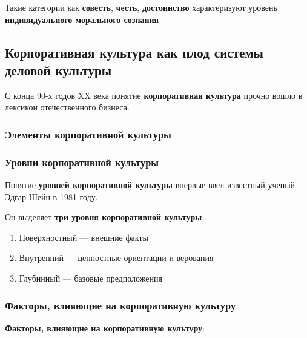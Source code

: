 Такие категории как \textbf{совесть}, \textbf{честь}, \textbf{достоинство} характеризуют уровень \textbf{индивидуального морального сознания}

\subsection{Корпоративная культура как плод системы деловой культуры}

С конца 90-х годов XX века понятие \textbf{корпоративная культура} прочно вошло в лексикон отечественного бизнеса.

\subsubsection{Элементы корпоративной культуры}

\begin{multienumerate}
\end{multienumerate}

\subsubsection{Уровни корпоративной культуры}

Понятие \textbf{уровней корпоративной культуры} впервые ввел известный ученый Эдгар Шейн в 1981 году.

Он выделяет \textbf{три уровня корпоративной культуры}:

\begin{enumerate}
    \item Поверхностный — внешние факты
    \item Внутренний — ценностные ориентации и верования
    \item Глубинный — базовые предположения
\end{enumerate}

\subsubsection{Факторы, влияющие на корпоративную культуру}

\textbf{Факторы, влияющие на корпоративную культуру}:

\begin{multienumerate}
\end{multienumerate}

